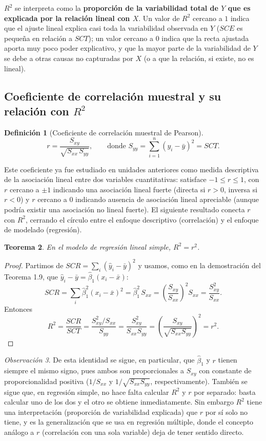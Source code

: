\documentclass[11pt,a4paper]{article}
\theoremstyle{plain}
\newtheorem{teorema}{Teorema}[section]
\theoremstyle{definition}
\newtheorem{definicion}[teorema]{Definición}
\theoremstyle{remark}
\newtheorem{observacion}[teorema]{Observación}
\begin{document}
$R^2$ se interpreta como la \textbf{proporción de la variabilidad total de $Y$ que es explicada por la relación lineal con $X$}. Un valor de $R^2$ cercano a $1$ indica que el ajuste lineal explica casi toda la variabilidad observada en $Y$ ($SCE$ es pequeña en relación a $SCT$); un valor cercano a $0$ indica que la recta ajustada aporta muy poco poder explicativo, y que la mayor parte de la variabilidad de $Y$ se debe a otras causas no capturadas por $X$ (o a que la relación, si existe, no es lineal).

\subsection{Coeficiente de correlación muestral y su relación con \texorpdfstring{$R^2$}{R2}}

\begin{definicion}[Coeficiente de correlación muestral de Pearson]
\[
r = \frac{S_{xy}}{\sqrt{S_{xx}\,S_{yy}}}, \qquad \text{donde } S_{yy}=\sum_{i=1}^n (y_i-\bar y)^2 = SCT.
\]
\end{definicion}

Este coeficiente ya fue estudiado en unidades anteriores como medida descriptiva de la asociación lineal entre dos variables cuantitativas: satisface $-1\leq r\leq 1$, con $r$ cercano a $\pm1$ indicando una asociación lineal fuerte (directa si $r>0$, inversa si $r<0$) y $r$ cercano a $0$ indicando ausencia de asociación lineal apreciable (aunque podría existir una asociación no lineal fuerte). El siguiente resultado conecta $r$ con $R^2$, cerrando el círculo entre el enfoque descriptivo (correlación) y el enfoque de modelado (regresión).

\begin{teorema}
En el modelo de regresión lineal simple, $R^2=r^2$.
\end{teorema}

\begin{proof}
Partimos de $SCR=\sum_i(\hat y_i-\bar y)^2$ y usamos, como en la demostración del Teorema 1.9, que $\hat y_i-\bar y=\hat\beta_1(x_i-\bar x)$:
\[
SCR = \sum_i \hat\beta_1^2(x_i-\bar x)^2 = \hat\beta_1^2\, S_{xx} = \left(\frac{S_{xy}}{S_{xx}}\right)^2 S_{xx} = \frac{S_{xy}^2}{S_{xx}}.
\]
Entonces
\[
R^2 = \frac{SCR}{SCT} = \frac{S_{xy}^2/S_{xx}}{S_{yy}} = \frac{S_{xy}^2}{S_{xx}S_{yy}} = \left(\frac{S_{xy}}{\sqrt{S_{xx}S_{yy}}}\right)^2 = r^2.
\]
\end{proof}

\begin{observacion}
De esta identidad se sigue, en particular, que $\hat\beta_1$ y $r$ tienen siempre el mismo signo, pues ambos son proporcionales a $S_{xy}$ con constante de proporcionalidad positiva ($1/S_{xx}$ y $1/\sqrt{S_{xx}S_{yy}}$, respectivamente). También se sigue que, en regresión simple, no hace falta calcular $R^2$ y $r$ por separado: basta calcular uno de los dos y el otro se obtiene inmediatamente. Sin embargo $R^2$ tiene una interpretación (proporción de variabilidad explicada) que $r$ por sí solo no tiene, y es la generalización que se usa en regresión múltiple, donde el concepto análogo a $r$ (correlación con una sola variable) deja de tener sentido directo.
\end{observacion}
\end{document}
